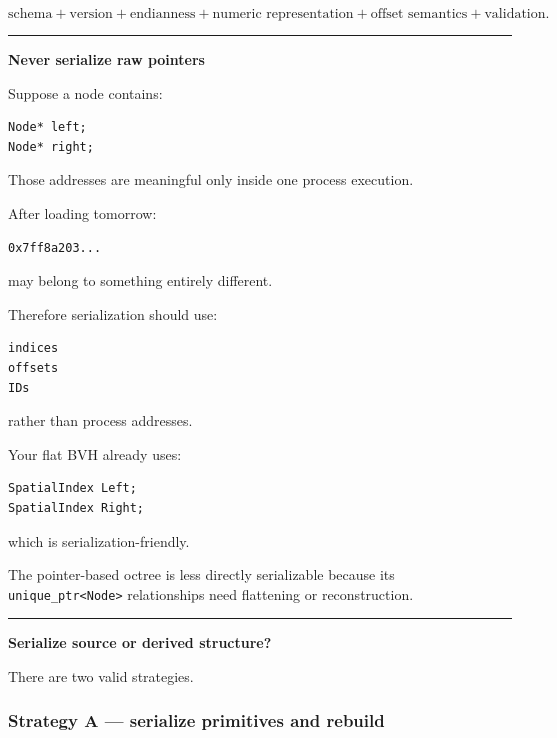\[
\boxed{
\text{schema}
+
\text{version}
+
\text{endianness}
+
\text{numeric representation}
+
\text{offset semantics}
+
\text{validation}.
}
\]

\begin{center}\rule{0.5\linewidth}{0.5pt}\end{center}

\textbf{Never serialize raw pointers}

Suppose a node contains:

\begin{verbatim}
Node* left;
Node* right;
\end{verbatim}

Those addresses are meaningful only inside one process execution.

After loading tomorrow:

\begin{verbatim}
0x7ff8a203...
\end{verbatim}

may belong to something entirely different.

Therefore serialization should use:

\begin{verbatim}
indices
offsets
IDs
\end{verbatim}

rather than process addresses.

Your flat BVH already uses:

\begin{verbatim}
SpatialIndex Left;
SpatialIndex Right;
\end{verbatim}

which is serialization-friendly.

The pointer-based octree is less directly serializable because its \texttt{unique\_ptr\textless{}Node\textgreater{}} relationships need flattening or reconstruction.

\begin{center}\rule{0.5\linewidth}{0.5pt}\end{center}

\textbf{Serialize source or derived structure?}

There are two valid strategies.

\subsubsection{Strategy A --- serialize primitives and rebuild}\label{strategy-a-serialize-primitives-and-rebuild}

